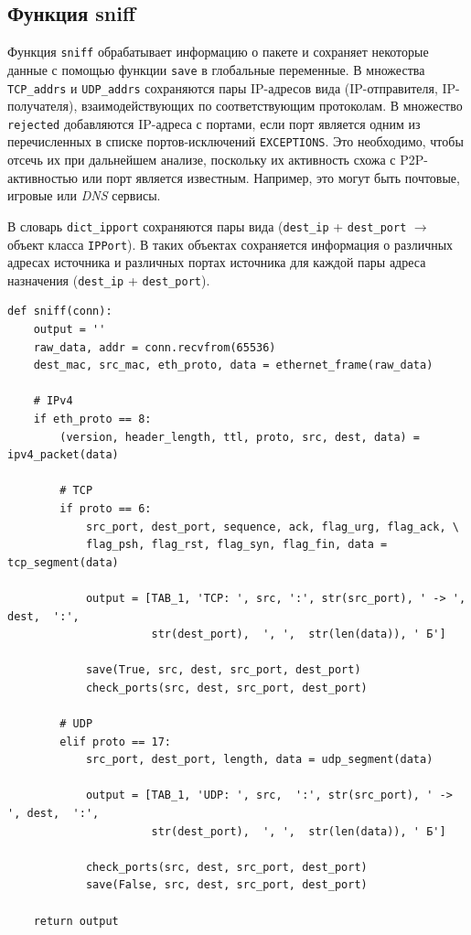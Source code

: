 \documentclass[bachelor, och, coursework]{SCWorks}
\begin{document}
\subsection{Функция sniff}
Функция \texttt{sniff} обрабатывает информацию о пакете и сохраняет некоторые данные с помощью функции \texttt{save} в глобальные переменные.
В множества \texttt{TCP_addrs} и \texttt{UDP_addrs} сохраняются пары IP-адресов вида (IP-отправителя, IP-получателя), взаимодействующих по соответствующим протоколам.
В множество \texttt{rejected} добавляются IP-адреса с портами, если порт является одним из перечисленных в списке портов-исключений \texttt{EXCEPTIONS}. 
Это необходимо, чтобы отсечь их при дальнейшем анализе, поскольку их активность схожа с P2P-активностью или порт является известным. Например, это могут быть почтовые, игровые или \textit{DNS} сервисы. 

В словарь \texttt{dict_ipport} сохраняются пары вида (\texttt{dest_ip} + \texttt{dest_port} $\to$ объект класса \texttt{IPPort}). 
В таких объектах сохраняется информация о различных адресах источника и различных портах источника для каждой пары адреса назначения (\texttt{dest_ip} + \texttt{dest_port}).

\begin{verbatim}
def sniff(conn):
    output = ''
    raw_data, addr = conn.recvfrom(65536)
    dest_mac, src_mac, eth_proto, data = ethernet_frame(raw_data)

    # IPv4
    if eth_proto == 8:
        (version, header_length, ttl, proto, src, dest, data) = ipv4_packet(data)

        # TCP
        if proto == 6:
            src_port, dest_port, sequence, ack, flag_urg, flag_ack, \
            flag_psh, flag_rst, flag_syn, flag_fin, data = tcp_segment(data)

            output = [TAB_1, 'TCP: ', src, ':', str(src_port), ' -> ', dest,  ':',
                      str(dest_port),  ', ',  str(len(data)), ' Б']

            save(True, src, dest, src_port, dest_port)
            check_ports(src, dest, src_port, dest_port)

        # UDP
        elif proto == 17:
            src_port, dest_port, length, data = udp_segment(data)

            output = [TAB_1, 'UDP: ', src,  ':', str(src_port), ' -> ', dest,  ':',
                      str(dest_port),  ', ',  str(len(data)), ' Б']

            check_ports(src, dest, src_port, dest_port)
            save(False, src, dest, src_port, dest_port)

    return output
\end{verbatim}
\end{document}
